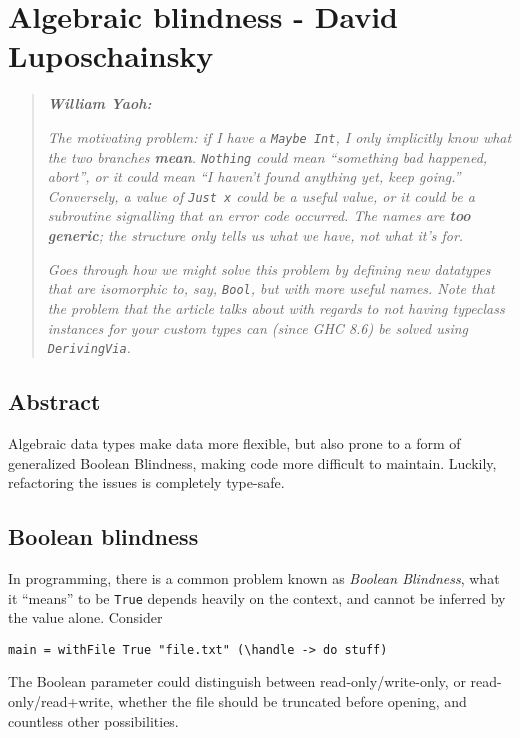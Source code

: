 \section{Algebraic blindness - David Luposchainsky}

\begin{quotation}
\noindent\textit{\textbf{William Yaoh:}}

\textit{The motivating problem: if I have a \texttt{Maybe Int}, I only implicitly know what the two branches \textbf{mean}. \texttt{Nothing} could mean ``something bad happened, abort'', or it could mean ``I haven't found anything yet, keep going.'' Conversely, a value of \texttt{Just x} could be a useful value, or it could be a subroutine signalling that an error code occurred. The names are \textbf{too generic}; the structure only tells us what we have, not what it's for.}

\textit{Goes through how we might solve this problem by defining new datatypes that are isomorphic to, say, \texttt{Bool}, but with more useful names. Note that the problem that the article talks about with regards to not having typeclass instances for your custom types can (since GHC 8.6) be solved using \texttt{DerivingVia}.}
\end{quotation}

\subsection{Abstract}

Algebraic data types make data more flexible, but also prone to a form of generalized Boolean Blindness, making code more difficult to maintain. Luckily, refactoring the issues is completely type-safe.

\subsection{Boolean blindness}


In programming, there is a common problem known as \textit{Boolean Blindness}, what it ``means'' to be \texttt{True} depends heavily on the context, and cannot be inferred by the value alone. Consider

\begin{verbatim}
main = withFile True "file.txt" (\handle -> do stuff)
\end{verbatim}
The Boolean parameter could distinguish between read-only\-/\-write-only, or read-only\-/\-read+write, whether the file should be truncated before opening, and countless other possibilities.

